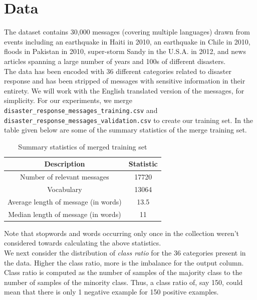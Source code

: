 \documentclass{article}
\begin{document}
\section{Data}
The dataset\cite{dataset} contains 30,000 messages (covering multiple languages) drawn from events including an earthquake in Haiti in 2010, an earthquake in Chile in 2010, floods in Pakistan in 2010, super-storm Sandy in the U.S.A. in 2012, and news articles spanning a large number of years and 100s of different disasters.
\\

The data has been encoded with 36 different categories related to disaster response and has been stripped of messages with sensitive information in their entirety. We will work with the English translated version of the messages, for simplicity. For our experiments, we merge \texttt{disaster\_response\_messages\_training.csv} and \texttt{disaster\_response\_messages\_validation.csv} to create our training set. In the table given below are some of the summary statistics of the merge training set.
\\

\begin{table}[h]
	\centering
	\begin{tabular}{cc}
		\toprule
		\textbf{Description} & \textbf{Statistic} \\ 
		\midrule
		Number of relevant messages & 17720 \\ 
		Vocabulary & 13064 \\
		Average length of message (in words) & 13.5 \\
		Median length of message (in words) & 11 \\
		\bottomrule
	\end{tabular}
\caption{Summary statistics of merged training set}
\label{training-summary}
\end{table}

Note that stopwords and words occurring only once in the collection weren't considered towards calculating the above statistics.
\\

We next consider the distribution of \textit{class ratio} for the 36 categories present in the data. Higher the class ratio, more is the imbalance for the output column. Class ratio is computed as the number of samples of the majority class to the number of samples of the minority class. Thus, a class ratio of, say 150, could mean that there is only 1 negative example for 150 positive examples.
\end{document}
